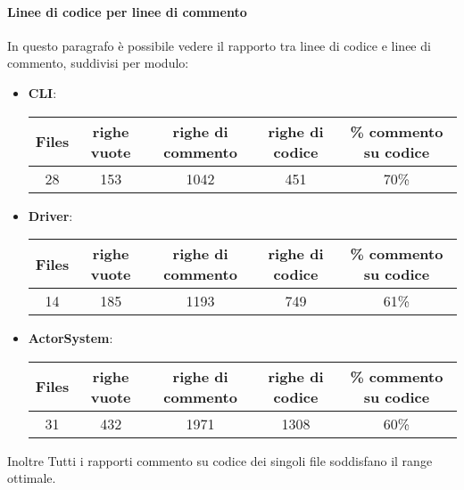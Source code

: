 \documentclass{scalatekids-article}
\begin{document}
\paragraph{Linee di codice per linee di commento}
In questo paragrafo è possibile vedere il rapporto tra linee di codice e
linee di commento, suddivisi per modulo:
\begin{itemize}
	
	\item \textbf{CLI}:
	\begin{center}
		\begin{tabular}{| c | c | c | c | c |}
			\hline
			Files & righe vuote & righe di commento & righe di codice & \% commento su codice\\
			\hline
			28 & 153 & 1042 & 451 & 70\% \\
			\hline
		\end{tabular}
	\end{center}
	
	\item \textbf{Driver}:
	\begin{center}
		\begin{tabular}{| c | c | c | c | c |}
			\hline
			Files & righe vuote & righe di commento & righe di codice & \% commento su codice\\
			\hline
			14 & 185 & 1193 & 749 & 61\% \\
			\hline
		\end{tabular}
	\end{center}
	
	\item \textbf{ActorSystem}:
	\begin{center}
		\begin{tabular}{| c | c | c | c | c |}
			\hline
			Files & righe vuote & righe di commento & righe di codice & \% commento su codice\\
			\hline
			31 & 432 & 1971 & 1308 & 60\% \\
			\hline
		\end{tabular}
	\end{center}
\end{itemize}

Inoltre Tutti i rapporti commento su codice dei singoli file soddisfano il range ottimale.
\end{document}
